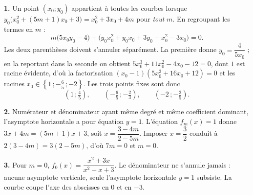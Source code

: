 \begin{corrige}
\textbf{1.} Un point $(x_{0};y_{0})$ appartient à toutes les courbes lorsque
$y_{0}\bigl(x_{0}^{2}+(5m+1)x_{0}+3\bigr) = x_{0}^{2}+3x_{0}+4m$ pour
\emph{tout} $m$. En regroupant les termes en $m$ :
\[
  m\bigl(5x_{0}y_{0}-4\bigr)
  + \bigl(y_{0}x_{0}^{2}+y_{0}x_{0}+3y_{0}-x_{0}^{2}-3x_{0}\bigr) = 0 .
\]
Les deux parenthèses doivent s'annuler séparément. La première donne
$y_{0} = \dfrac{4}{5x_{0}}$ ; en la reportant dans la seconde on obtient
$5x_{0}^{3}+11x_{0}^{2}-4x_{0}-12 = 0$, dont $1$ est racine évidente, d'où la
factorisation $(x_{0}-1)(5x_{0}^{2}+16x_{0}+12) = 0$ et les racines
$x_{0} \in \left\{1\,;-\tfrac{6}{5}\,;-2\right\}$. Les trois points fixes sont
donc
\[
  \left(1\,;\tfrac45\right), \qquad
  \left(-\tfrac65\,;-\tfrac23\right), \qquad
  \left(-2\,;-\tfrac25\right).
\]

\textbf{2.} Numérateur et dénominateur ayant même degré et même coefficient
dominant, l'asymptote horizontale a pour équation $y = 1$. L'équation
$f_{m}(x) = 1$ donne $3x+4m = (5m+1)x+3$, soit $x = \dfrac{3-4m}{2-5m}$.
Imposer $x = \dfrac32$ conduit à $2(3-4m) = 3(2-5m)$, d'où $7m = 0$ et
$m = 0$.

\textbf{3.} Pour $m = 0$, $f_{0}(x) = \dfrac{x^{2}+3x}{x^{2}+x+3}$. Le
dénominateur ne s'annule jamais : aucune asymptote verticale, seule
l'asymptote horizontale $y=1$ subsiste. La courbe coupe l'axe des abscisses en
$0$ et en $-3$.
\end{corrige}


